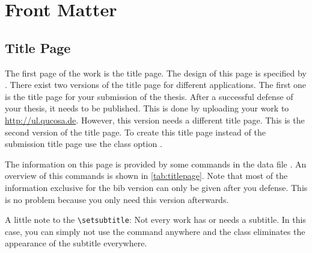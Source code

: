 
\chapter{Front Matter}%
\label{Chapter2}

\section{Title Page}%
\label{opt:bib}

The first page of the work is the title page. The design of this page is
specified by \citet{web:promotion}. There exist two versions of the title page
for different applications. The first one is the title page for your
submission of the thesis. After a successful defense of your thesis, it needs
to be published. This is done by uploading your work to
\url{http://ul.qucosa.de}. However, this version needs a different title page.
This is the second version of the title page. To create this title page
instead of the submission title page use the class option
.

The information on this page is provided by some commands in the data file
. An overview of this commands is shown in
\autoref{tab:titlepage}. Note that most of the information exclusive for the
bib version can only be given after you defense. This is no problem because
you only need this version afterwards.

A little note to the \verb!\setsubtitle!: Not every work has or needs a
subtitle. In this case, you can simply not use the command
anywhere and the class eliminates the appearance of the subtitle everywhere.


